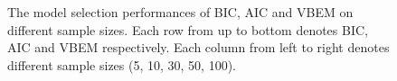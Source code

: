 \documentclass[12pt,a4paper]{article}
\theoremstyle{definition}
\begin{document}
\begin{figure}[htbp]
{	}
	\caption{The model selection performances of BIC, AIC and VBEM on different sample sizes. Each row from up to bottom denotes BIC, AIC and VBEM respectively. Each column from left to right denotes different sample sizes (5, 10, 30, 50, 100).}
	\label{fig:sample_comp1}
\end{figure}
\end{document}
